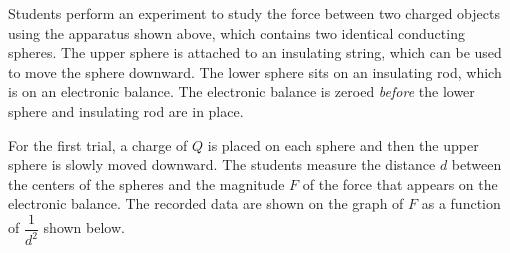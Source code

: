 \documentclass{../../../oss-apphys-exam}
\begin{document}
\begin{questions}
  \question Students perform an experiment to study the force between two
  charged objects using the apparatus shown above, which contains two identical
  conducting spheres. The upper sphere is attached to an insulating string,
  which can be used to move the sphere downward. The lower sphere sits on an
  insulating rod, which is on an electronic balance. The electronic balance is
  zeroed \emph{before} the lower sphere and insulating rod are in place.

  \vspace{.15in}For the first trial, a charge of $Q$ is placed on each sphere
  and then the upper sphere is slowly moved downward. The students measure the
  distance $d$ between the centers of the spheres and the magnitude $F$ of the
  force that appears on the electronic balance. The recorded data are shown on
  the graph of $F$ as a function of $\dfrac1{d^2}$ shown below. 
\end{questions}
\end{document}
